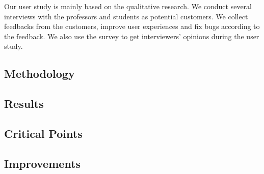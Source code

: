 Our user study is mainly based on the qualitative research.
We conduct several interviews with the professors and students as potential customers.
We collect feedbacks from the customers, improve user experiences and fix bugs according to the feedback.
We also use the survey to get interviewers' opinions during the user study.

\subsection{Methodology}

\subsection{Results}

\subsection{Critical Points}

\subsection{Improvements}

